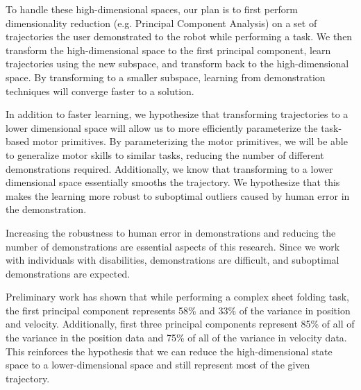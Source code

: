\documentclass{acm_proc_article-sp}
\begin{document}
To handle these high-dimensional spaces, our plan is to first perform dimensionality reduction (e.g. Principal Component Analysis) on a set of trajectories the user demonstrated to the robot while performing a task. We then transform the high-dimensional space to the first principal component, learn trajectories using the new subspace, and transform back to the high-dimensional space. By transforming to a smaller subspace, learning from demonstration techniques will converge faster to a solution.

In addition to faster learning, we hypothesize that transforming trajectories to a lower dimensional space will allow us to more efficiently parameterize the task-based motor primitives. By parameterizing the motor primitives, we will be able to generalize motor skills to similar tasks, reducing the number of different demonstrations required. Additionally, we know that transforming to a lower dimensional space essentially smooths the trajectory. We hypothesize that this makes the learning more robust to suboptimal outliers caused by human error in the demonstration. 

Increasing the robustness to human error in demonstrations and reducing the number of demonstrations are essential aspects of this research. Since we work with individuals with disabilities, demonstrations are difficult, and suboptimal demonstrations are expected.

Preliminary work has shown that while performing a complex sheet folding task, the first principal component represents 58\% and 33\% of the variance in position and velocity. Additionally, first three principal components represent 85\% of all of the variance in the position data and 75\% of all of the variance in velocity data. This reinforces the hypothesis that we can reduce the high-dimensional state space to a lower-dimensional space and still represent most of the given trajectory.


\end{document}
